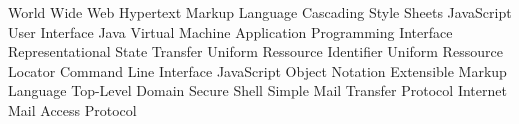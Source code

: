 \begin{acronym}[HTML]
			{World Wide Web}
			{Hypertext Markup Language}
			{Cascading Style Sheets}
			{JavaScript}
			{User Interface}
			{Java Virtual Machine}
   			{Application Programming Interface}
	     {Representational State Transfer}
	      {Uniform Ressource Identifier}
	      {Uniform Ressource Locator}
	      {Command Line Interface}
	     {JavaScript Object Notation}
	      {Extensible Markup Language}
			{Top-Level Domain}
			{Secure Shell}
			{Simple Mail Transfer Protocol}
			{Internet Mail Access Protocol}
\end{acronym}

